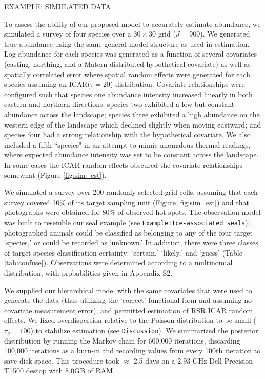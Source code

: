 \documentclass[12pt,fleqn]{article}
\begin{document}
\begin{flushleft}
\vspace{.15in}
EXAMPLE: SIMULATED DATA \\
\vspace{.15in}

To assess the ability of our proposed model to accurately estimate abundance, we simulated a survey
of four species over a $30 \times 30$ grid ($J=900$).  We generated true abundance using the same general model structure
as used in estimation.  Log abundance for each species was generated as a function of several covariates (easting, northing, and a Matern-distributed hypothetical covariate) as well as spatially correlated error where spatial random effects were generated for each species assuming an ICAR($\tau=20$) distribution.  Covariate relationships were configured such that species one abundance intensity increased linearly in both eastern and northern directions; species two exhibited a low but constant abundance across the landscape; species three exhibited a high abundance on the western edge of the landscape which declined slightly when moving eastward; and species four had a strong relationship with the hypothetical covariate.  We also included a fifth ``species" in an attempt to mimic anomalous thermal readings, where expected abundance intensity was  set to be constant across the landscape.  In some cases the ICAR random effects obscured the covariate relationships somewhat (Figure \ref{fig:sim_est}).

\hspace{.5in}We simulated a survey over 200 randomly selected grid cells, assuming that each survey covered 10\% of its target sampling unit (Figure \ref{fig:sim_est}) and that photographs were obtained for 80\% of observed hot spots.  The observation model was built to resemble our seal example (see \texttt{Example:Ice-associated seals}); photographed animals could be classified as belonging to any of the four target `species,' or could be recorded as `unknown.'  In addition, there were three classes of target species classification certainty: `certain,' `likely,' and `guess' (Table \ref{tab:confuse}).  Observations were determined according to a multinomial distribution, with probabilities given in Appendix S2.

\hspace{.5in}We supplied our hierarchical model with the same covariates that were used to generate the data (thus utilizing the `correct' functional form and assuming no covariate measurement error), and permitted estimation of RSR ICAR random effects.  We fixed overdispersion relative to the Poisson distribution to be small ($\tau_\nu = 100$) to stabilize estimation (see \texttt{Discussion}).  We summarized the posterior distribution by running the Markov chain for 600,000 iterations, discarding 100,000 iterations as a burn-in and recording values from every 100th iteration to save disk space.  This procedure took $\approx$ 2.5 days on a 2.93 GHz Dell Precision T1500 destop with 8.0GB of RAM.



\end{flushleft}
\end{document}
